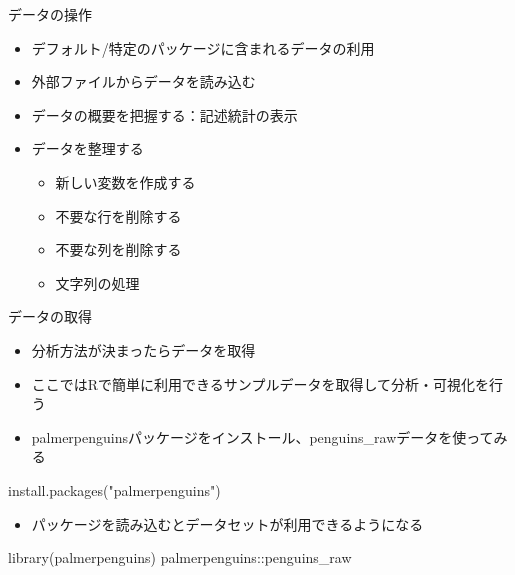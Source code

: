 \documentclass[
  ignorenonframetext,
]{beamer}
\newenvironment{Shaded}{\begin{snugshade}}{\end{snugshade}}
\newcommand{\FunctionTok}[1]{\textcolor[rgb]{0.00,0.00,0.00}{#1}}
\newcommand{\NormalTok}[1]{#1}
\newcommand{\SpecialCharTok}[1]{\textcolor[rgb]{0.00,0.00,0.00}{#1}}
\newcommand{\StringTok}[1]{\textcolor[rgb]{0.31,0.60,0.02}{#1}}
\providecommand{\tightlist}{%
  \setlength{\itemsep}{0pt}\setlength{\parskip}{0pt}}
\begin{document}
\begin{frame}[fragile]{データの操作}
\protect\hypertarget{ux30c7ux30fcux30bfux306eux64cdux4f5c-1}{}
\begin{itemize}
\tightlist
\item
  デフォルト/特定のパッケージに含まれるデータの利用
\item
  外部ファイルからデータを読み込む
\item
  データの概要を把握する：記述統計の表示
\item
  データを整理する

  \begin{itemize}
  \tightlist
  \item
    新しい変数を作成する
  \item
    不要な行を削除する
  \item
    不要な列を削除する
  \item
    文字列の処理
  \end{itemize}
\end{itemize}

\begin{block}{データの取得}
\protect\hypertarget{ux30c7ux30fcux30bfux306eux53d6ux5f97}{}
\begin{itemize}
\tightlist
\item
  分析方法が決まったらデータを取得
\item
  ここではRで簡単に利用できるサンプルデータを取得して分析・可視化を行う
\item
  palmerpenguinsパッケージをインストール、penguins\_rawデータを使ってみる
\end{itemize}

\begin{Shaded}
\begin{Highlighting}[]
\FunctionTok{install.packages}\NormalTok{(}\StringTok{"palmerpenguins"}\NormalTok{)}
\end{Highlighting}
\end{Shaded}

\begin{itemize}
\tightlist
\item
  パッケージを読み込むとデータセットが利用できるようになる
\end{itemize}

\begin{Shaded}
\begin{Highlighting}[]
\FunctionTok{library}\NormalTok{(palmerpenguins)}
\NormalTok{palmerpenguins}\SpecialCharTok{::}\NormalTok{penguins\_raw}
\end{Highlighting}
\end{Shaded}
\end{block}


\end{frame}
\end{document}
